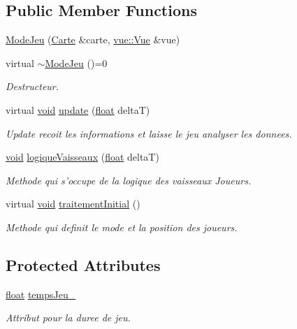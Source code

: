 \subsection*{Public Member Functions}
\begin{DoxyCompactItemize}
\item 
\hyperlink{group__inf2990_gaae4dfdb2139bd24d7d8858258a37b736}{Mode\-Jeu} (\hyperlink{class_carte}{Carte} \&carte, \hyperlink{classvue_1_1_vue}{vue\-::\-Vue} \&vue)
\item 
virtual \hyperlink{group__inf2990_ga0008e7eb90594852a3d2426f890e470e}{$\sim$\-Mode\-Jeu} ()=0
\begin{DoxyCompactList}\small\item\em Destructeur. \end{DoxyCompactList}\item 
virtual \hyperlink{wglew_8h_aeea6e3dfae3acf232096f57d2d57f084}{void} \hyperlink{group__inf2990_ga9dc0e59a90ca442a5ca07e810e8eaa62}{update} (\hyperlink{fmod_8h_aeb841aa4b4b5f444b5d739d865b420af}{float} delta\-T)
\begin{DoxyCompactList}\small\item\em Update recoit les informations et laisse le jeu analyser les donnees. \end{DoxyCompactList}\item 
\hyperlink{wglew_8h_aeea6e3dfae3acf232096f57d2d57f084}{void} \hyperlink{group__inf2990_gaf96271bae84dac32f8dd5ce7e7eb4bb7}{logique\-Vaisseaux} (\hyperlink{fmod_8h_aeb841aa4b4b5f444b5d739d865b420af}{float} delta\-T)
\begin{DoxyCompactList}\small\item\em Methode qui s'occupe de la logique des vaisseaux Joueurs. \end{DoxyCompactList}\item 
virtual \hyperlink{wglew_8h_aeea6e3dfae3acf232096f57d2d57f084}{void} \hyperlink{group__inf2990_ga46958594262809ada6a0bcf7bc53bd2c}{traitement\-Initial} ()
\begin{DoxyCompactList}\small\item\em Methode qui definit le mode et la position des joueurs. \end{DoxyCompactList}\end{DoxyCompactItemize}
\subsection*{Protected Attributes}
\begin{DoxyCompactItemize}
\item 
\hyperlink{fmod_8h_aeb841aa4b4b5f444b5d739d865b420af}{float} \hyperlink{group__inf2990_gab9c63901c8b14b0d0a11de3e76e686a0}{temps\-Jeu\-\_\-}
\begin{DoxyCompactList}\small\item\em Attribut pour la duree de jeu. \end{DoxyCompactList}\end{DoxyCompactItemize}


